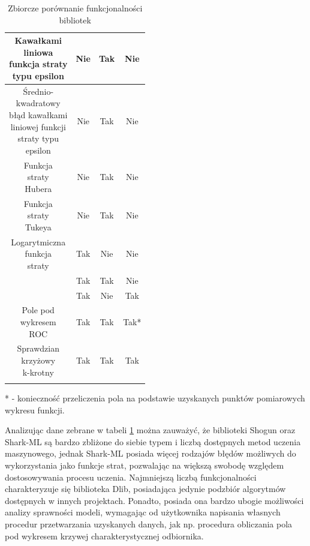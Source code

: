 \begin{longtable}{c | c | c | c}
	\hline
	\makecell{Kawałkami \\ liniowa \\ funkcja straty \\ typu epsilon} & Nie & Tak & Nie\\
	\hline
	\makecell{Średnio-\\kwadratowy \\ błąd kawałkami \\ liniowej funkcji \\ straty typu \\ epsilon} & Nie & Tak & Nie\\
	\hline
	\makecell{Funkcja \\ straty \\ Hubera} & Nie & Tak & Nie\\
	\hline
	\makecell{Funkcja \\ straty \\ Tukeya} & Nie & Tak & Nie\\
	\hline
	\makecell{Logarytmiczna \\ funkcja \\ straty} & Tak & Nie & Nie\\
	\hline
	\makecell{Metryka $R^2$} & Tak & Tak & Nie\\
	\hline
	\makecell{Dokładność} & Tak & Nie & Tak \\
	\hline
	\makecell{Pole pod \\ wykresem \\ ROC} & Tak & Tak & Tak* \\
	\hline
	\makecell{Sprawdzian \\ krzyżowy \\ k-krotny} & Tak & Tak & Tak \\
	\caption{Zbiorcze porównanie funkcjonalności bibliotek}
	\label{fun:sum}
\end{longtable} 

* - konieczność przeliczenia pola na podstawie uzyskanych punktów pomiarowych wykresu funkcji.

Analizując dane zebrane w tabeli \ref{fun:sum} można zauważyć, że biblioteki Shogun oraz Shark-ML są bardzo zbliżone do siebie typem i liczbą dostępnych metod uczenia maszynowego, jednak Shark-ML posiada więcej rodzajów błędów możliwych do wykorzystania jako funkcje strat, pozwalając na większą swobodę względem dostosowywania procesu uczenia. Najmniejszą liczbą funkcjonalności charakteryzuje się biblioteka Dlib, posiadająca jedynie podzbiór algorytmów dostępnych w innych projektach. Ponadto, posiada ona bardzo ubogie możliwości analizy sprawności modeli, wymagając od użytkownika napisania własnych procedur przetwarzania uzyskanych danych, jak np. procedura obliczania pola pod wykresem krzywej charakterystycznej odbiornika.

